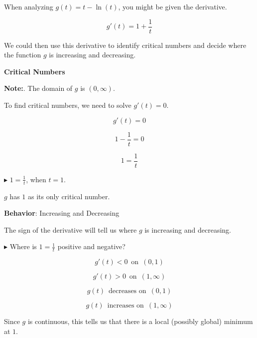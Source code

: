 \documentclass{ximera}
\begin{document}
\begin{example}

When analyzing $g(t) = t - \ln(t)$, you might be given the derivative.


\[
g'(t) = 1 + \frac{1}{t} 
\]


We could then use this derivative to identify critical numbers and decide where the function $g$ is increasing and decreasing.




\textbf{Critical Numbers} 


\textbf{Note:}. The domain of $g$ is $(0, \infty)$. 



To find critical numbers, we need to solve $g'(t) = 0$. 


\[
g'(t) = 0
\]


\[
1 - \frac{1}{t}  = 0
\]


\[
1  = \frac{1}{t}
\]





$\blacktriangleright$ $1  = \frac{1}{t}$, when $t = 1$. 



$g$ has $1$ as its only critical number. 




\textbf{Behavior}: Increasing and Decreasing 



The sign of the derivative will tell us where $g$ is increasing and decreasing. 


\textbf{\textcolor{blue!55!black}{$\blacktriangleright$}} Where is $1  = \frac{1}{t}$ positive and negative?





\[
g'(t) < 0 \, \text{ on } \, (0, 1)
\]


\[
g'(t) > 0 \, \text{ on } \, (1, \infty)
\]





\[
g(t)  \, \text{ decreases on } \,  (0, 1)
\]


\[
g(t)  \, \text{ increases on } \, (1, \infty)
\]



Since $g$ is continuous, this tells us that there is a local (possibly global) minimum at $1$.


\end{example}
\end{document}
